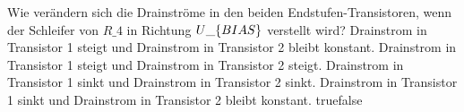     {Wie verändern sich die Drainströme in den beiden Endstufen-Transistoren, wenn der Schleifer von $R\_4$ in Richtung $U\_\text\{BIAS\}$ verstellt wird?}
    {Drainstrom in Transistor 1 steigt und Drainstrom in Transistor 2 bleibt konstant.}
    {Drainstrom in Transistor 1 steigt und Drainstrom in Transistor 2 steigt.}
    {Drainstrom in Transistor 1 sinkt und Drainstrom in Transistor 2 sinkt.}
    {Drainstrom in Transistor 1 sinkt und Drainstrom in Transistor 2 bleibt konstant.}
    {true}{false}